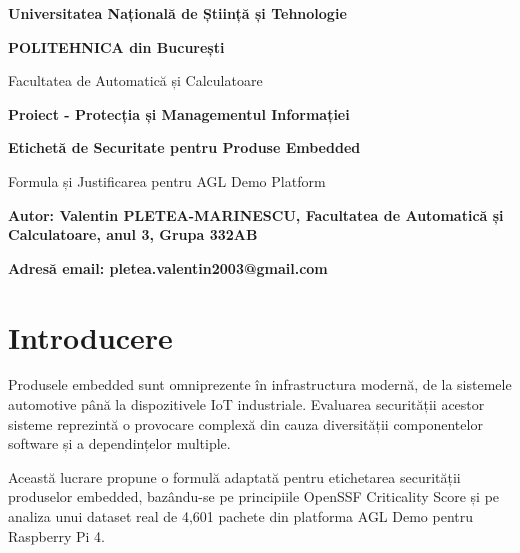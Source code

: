 \documentclass[12pt,a4paper]{article}
\begin{document}
\begin{titlepage}
    \centering
    \vspace{1cm}
    
    {\Large\bfseries\centering Universitatea Națională de Știință și Tehnologie}
    
    {\large\bfseries\centering POLITEHNICA din București}
    
    {\large\centering Facultatea de Automatică și Calculatoare}
        
    \vspace{3cm}
    
    {\Large\bfseries\centering Proiect - Protecția și Managementul Informației}

    \vspace{2cm}
    
    {\LARGE\bfseries\centering Etichetă de Securitate pentru Produse Embedded\\[1cm]}
    
    {\large\centering Formula și Justificarea pentru AGL Demo Platform}

    \vspace{\fill}
    
    \raggedright
    {\large\bfseries Autor: Valentin PLETEA-MARINESCU, Facultatea de Automatică și
    Calculatoare, anul 3, Grupa 332AB \par}
    {\large\bfseries Adresă email: pletea.valentin2003@gmail.com \par}
    
    \vspace{1cm}
    
\end{titlepage}

\hypersetup{
    colorlinks=false,
    linkcolor=black,
    filecolor=black,      
    urlcolor=black,
    hidelinks
}
\tableofcontents
\newpage

\section{Introducere}

Produsele embedded sunt omniprezente în infrastructura modernă, de la sistemele automotive până la dispozitivele IoT industriale. Evaluarea securității acestor sisteme reprezintă o provocare complexă din cauza diversității componentelor software și a dependințelor multiple.

Această lucrare propune o formulă adaptată pentru etichetarea securității produselor embedded, bazându-se pe principiile OpenSSF Criticality Score și pe analiza unui dataset real de 4,601 pachete din platforma AGL Demo pentru Raspberry Pi 4.
\end{document}
